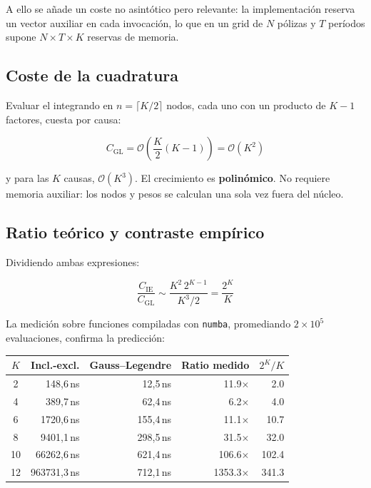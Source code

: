 \documentclass[a4paper, 12pt]{article}
\begin{document}
A ello se añade un coste no asintótico pero relevante: la implementación reserva un vector auxiliar en cada invocación, lo que en un grid de $N$ pólizas y $T$ períodos supone $N \times T \times K$ reservas de memoria.

\subsection{Coste de la cuadratura}

Evaluar el integrando en $n = \lceil K/2 \rceil$ nodos, cada uno con un producto de $K-1$ factores, cuesta por causa:

\begin{equation}
C_{\text{GL}} = \mathcal{O}\!\left(\frac{K}{2}(K-1)\right) = \mathcal{O}(K^2)
\end{equation}

y para las $K$ causas, $\mathcal{O}(K^3)$. El crecimiento es \textbf{polinómico}. No requiere memoria auxiliar: los nodos y pesos se calculan una sola vez fuera del núcleo.

\subsection{Ratio teórico y contraste empírico}

Dividiendo ambas expresiones:

\begin{equation}
\frac{C_{\text{IE}}}{C_{\text{GL}}} \sim \frac{K^2\,2^{K-1}}{K^3/2} = \frac{2^K}{K}
\label{eq:ratio}
\end{equation}

La medición sobre funciones compiladas con \texttt{numba}, promediando $2\times 10^5$ evaluaciones, confirma la predicción:

\begin{center}
\begin{tabular}{crrrr}
\toprule
$K$ & Incl.-excl. & Gauss--Legendre & Ratio medido & $2^K/K$ \\
\midrule
2 & 148,6\,ns & 12,5\,ns & 11.9$\times$ & 2.0 \\
4 & 389,7\,ns & 62,4\,ns & 6.2$\times$ & 4.0 \\
6 & 1720,6\,ns & 155,4\,ns & 11.1$\times$ & 10.7 \\
8 & 9401,1\,ns & 298,5\,ns & 31.5$\times$ & 32.0 \\
10 & 66262,6\,ns & 621,4\,ns & 106.6$\times$ & 102.4 \\
12 & 963731,3\,ns & 712,1\,ns & 1353.3$\times$ & 341.3 \\
\bottomrule
\end{tabular}
\end{center}
\end{document}
